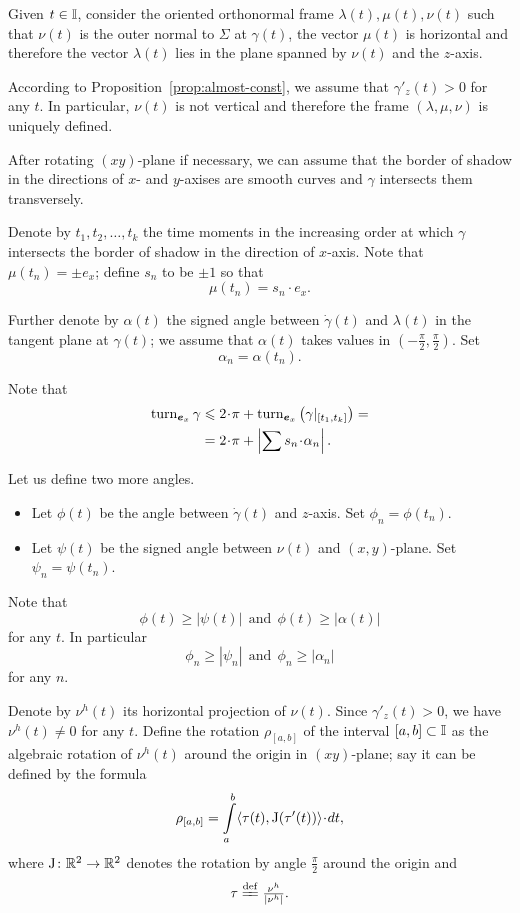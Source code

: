 \documentclass[a4paper,10pt]{amsart}
\begin{document}
Given $t\in \mathbb{I}$, 
consider the oriented orthonormal frame $\lambda(t),\mu(t),\nu(t)$ 
such that $\nu(t)$ is the outer normal to $\Sigma$ at $\gamma(t)$,
the vector $\mu(t)$ is horizontal and therefore the vector $\lambda(t)$ lies in the plane spanned by $\nu(t)$ and the $z$-axis.

According to Proposition~\ref{prop:almost-const},
 we assume that $\gamma'_z(t)>0$ for any $t$.
In particular, $\nu(t)$ is not vertical and therefore
the frame $(\lambda,\mu,\nu)$ is uniquely defined.

After rotating $(xy)$-plane if necessary, 
we can assume that the border of shadow in the directions of $x$- and $y$-axises 
are smooth curves and $\gamma$ intersects them transversely.

Denote by $t_1,t_2,\dots, t_k$ the time moments in the increasing order 
at which $\gamma$ intersects 
the border of shadow in the direction of $x$-axis.
Note that $\mu(t_n)=\pm e_x$;
define $s_n$ to be $\pm1$ so that
\[\mu(t_n)=s_n\cdot e_x.\]

Further denote by $\alpha(t)$ the signed angle between $\dot\gamma(t)$ and $\lambda(t)$ in the tangent plane at $\gamma(t)$;
we assume that $\alpha(t)$ takes values in $(-\tfrac\pi2,\tfrac\pi2)$.
Set 
\[\alpha_n=\alpha(t_n).\]

Note that  
\begin{align*}
\turn_{\bm{e}_x} \gamma
&\le 
2\cdot\pi+\turn_{\bm{e}_x}\left(\gamma|_{[t_1,t_k]}\right)=
\\
&=2\cdot\pi+\left|\sum s_n\cdot \alpha_n\right|.
\end{align*}

Let us define two more angles.
\begin{itemize}
\item Let $\phi(t)$ be the angle between $\dot\gamma(t)$ and $z$-axis. Set $\phi_n=\phi(t_n)$.
\item Let $\psi(t)$ be the signed angle between $\nu(t)$ and $(x,y)$-plane. 
Set $\psi_n=\psi(t_n)$.
\end{itemize}
Note that 
\[\phi(t)\ge |\psi(t)|\ \ \text{and}\ \  \phi(t)\ge |\alpha(t)|\] 
for any $t$.
In particular 
\[\phi_n\ge |\psi_n|\ \ \text{and}\ \  \phi_n\ge |\alpha_n|\]
for any $n$.

Denote by $\nu^h(t)$ its horizontal projection of $\nu(t)$.
Since $\gamma'_z(t)>0$, 
we have $\nu^h(t)\ne0$ for any $t$.
Define the rotation $\rho_{[a,b]}$  
of the interval $[a,b]\subset\mathbb{I}$
as the
algebraic rotation of $\nu^h(t)$ around the origin in $(xy)$-plane;
say it can be defined by the formula 
\[\rho_{[a,b]}
=
\int\limits_a^b \<\tau(t),\mathrm{J}(\tau'(t))\>\cdot dt,\]
where $\mathrm{J}\colon\mathbb{R}^2\to\mathbb{R}^2$ denotes the rotation by angle $\tfrac\pi 2$ around the origin and \[\tau\df\tfrac{\nu^h}{|\nu^h|}.\]
\end{document}
